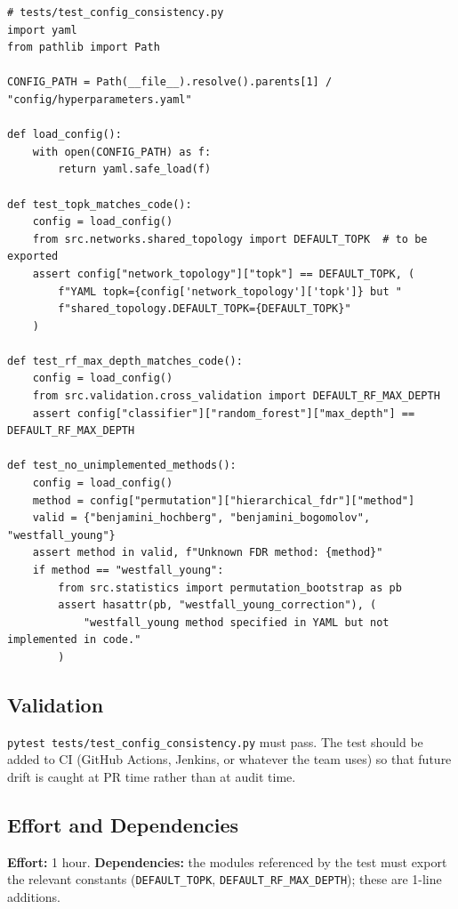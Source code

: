 \documentclass[11pt]{article}
\newcommand{\code}[1]{\texttt{#1}}
\begin{document}
\begin{lstlisting}[style=pythonstyle,caption={Config-consistency unit test.}]
# tests/test_config_consistency.py
import yaml
from pathlib import Path

CONFIG_PATH = Path(__file__).resolve().parents[1] / "config/hyperparameters.yaml"

def load_config():
    with open(CONFIG_PATH) as f:
        return yaml.safe_load(f)

def test_topk_matches_code():
    config = load_config()
    from src.networks.shared_topology import DEFAULT_TOPK  # to be exported
    assert config["network_topology"]["topk"] == DEFAULT_TOPK, (
        f"YAML topk={config['network_topology']['topk']} but "
        f"shared_topology.DEFAULT_TOPK={DEFAULT_TOPK}"
    )

def test_rf_max_depth_matches_code():
    config = load_config()
    from src.validation.cross_validation import DEFAULT_RF_MAX_DEPTH
    assert config["classifier"]["random_forest"]["max_depth"] == DEFAULT_RF_MAX_DEPTH

def test_no_unimplemented_methods():
    config = load_config()
    method = config["permutation"]["hierarchical_fdr"]["method"]
    valid = {"benjamini_hochberg", "benjamini_bogomolov", "westfall_young"}
    assert method in valid, f"Unknown FDR method: {method}"
    if method == "westfall_young":
        from src.statistics import permutation_bootstrap as pb
        assert hasattr(pb, "westfall_young_correction"), (
            "westfall_young method specified in YAML but not implemented in code."
        )
\end{lstlisting}

\subsection{Validation}

\code{pytest tests/test\_config\_consistency.py} must pass. The test should be added to CI (GitHub Actions, Jenkins, or whatever the team uses) so that future drift is caught at PR time rather than at audit time.

\subsection{Effort and Dependencies}

\textbf{Effort:} 1 hour. \textbf{Dependencies:} the modules referenced by the test must export the relevant constants (\code{DEFAULT\_TOPK}, \code{DEFAULT\_RF\_MAX\_DEPTH}); these are 1-line additions.
\end{document}
